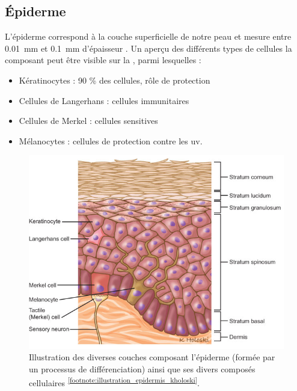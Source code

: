 \subsection{Épiderme}
L’épiderme correspond à la couche superficielle de notre peau et mesure entre \SI{0,01}{\milli\metre} et \SI{0,1}{\milli\metre} d’épaisseur \cite{Sandby-Moller2003}. Un aperçu des différents types de cellules la composant peut être visible sur la , parmi lesquelles :
\begin{itemize}
\item Kératinocytes : 90 \% des cellules, rôle de protection
\item Cellules de Langerhans : cellules immunitaires
\item Cellules de Merkel : cellules sensitives
\item Mélanocytes : cellules de protection contre les \gls{uv}.
\end{itemize}\par

 \begin{figure}[H]
    \centering
    \includegraphics[width=0.7\linewidth]{contents/chapter_1/resources/illustration_epidermis_kholoski.png}
    \caption{Illustration des diverses couches composant l'épiderme (formée par un processus de différenciation) ainsi que ses divers composés cellulaires \textsuperscript{\ref{footnote:illustration_epidermis_kholoski}}.}
    \label{fig:illustration_epidermis_kholoski}
\end{figure}\par

\addtocounter{footnote}{1}

